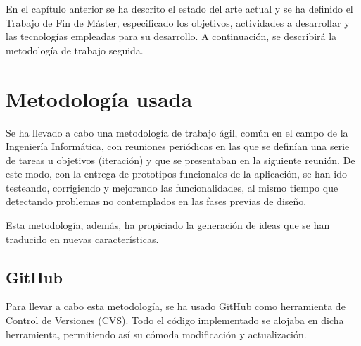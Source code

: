 

En el capítulo anterior se ha descrito el estado del arte actual y se ha definido el Trabajo de Fin de Máster, especificado los objetivos, actividades a desarrollar y las tecnologías empleadas para su desarrollo. A continuación, se describirá la metodología de trabajo seguida.


\section{Metodología usada}
\label{2:sec:1}

Se ha llevado a cabo una metodología de trabajo ágil, común en el campo de la Ingeniería Informática, con reuniones periódicas en las que se definían una serie de tareas u objetivos (iteración) y que se presentaban en la siguiente reunión. 
De este modo, con la entrega de prototipos funcionales de la aplicación, se han ido testeando, corrigiendo y mejorando las 
funcionalidades, al mismo tiempo que detectando problemas no contemplados en las fases previas de diseño.

Esta metodología, además, ha propiciado la generación de ideas que se han traducido en nuevas características.


\subsection{GitHub}
\label{subsec:2.1.1}

Para llevar a cabo esta metodología, se ha usado GitHub como herramienta de Control de Versiones (CVS).
Todo el código implementado se alojaba en dicha herramienta, permitiendo así su cómoda modificación y actualización.

